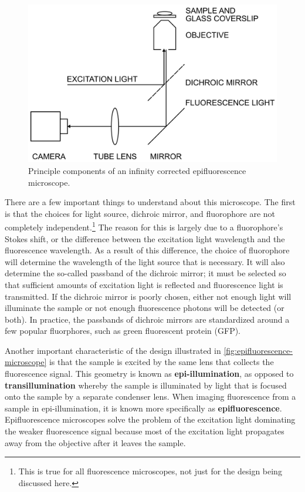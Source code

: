 \documentclass[10pt,a4paper,oneside]{book}
\begin{document}
\begin{figure}[ht]
    \centering
    \includegraphics{epifluorescence-microscope.png}
    \caption{Principle components of an infinity corrected epifluorescence microscope.}
    \label{fig:epifluorescence-microscope}
\end{figure}

There are a few important things to understand about this microscope. The first is that the choices for light source, dichroic mirror, and fluorophore are not completely independent.\footnote{This is true for all fluorescence microscopes, not just for the design being discussed here.} The reason for this is largely due to a fluorophore's Stokes shift, or the difference between the excitation light wavelength and the fluorescence wavelength. As a result of this difference, the choice of fluorophore will determine the wavelength of the light source that is necessary. It will also determine the so-called passband of the dichroic mirror; it must be selected so that sufficient amounts of excitation light is reflected and fluorescence light is transmitted. If the dichroic mirror is poorly chosen, either not enough light will illuminate the sample or not enough fluorescence photons will be detected (or both). In practice, the passbands of dichroic mirrors are standardized around a few popular fluorphores, such as green fluorescent protein (GFP).

Another important characteristic of the design illustrated in \autoref{fig:epifluorescence-microscope} is that the sample is excited by the same lens that collects the fluorescence signal. This geometry is known as \textbf{epi-illumination}, as opposed to \textbf{transillumination} whereby the sample is illuminated by light that is focused onto the sample by a separate condenser lens. When imaging fluorescence from a sample in epi-illumination, it is known more specifically as \textbf{epifluorescence}. Epifluorescence microscopes solve the problem of the excitation light dominating the weaker fluorescence signal because most of the excitation light propagates away from the objective after it leaves the sample.
\end{document}
